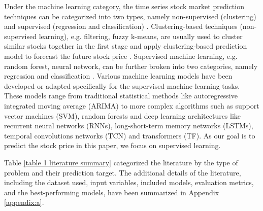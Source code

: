 \documentclass{article}
\begin{document}
Under the machine learning category, the time series stock market prediction techniques can be categorized into two types, namely non-supervised (clustering) and supervised (regression and classification) \citep{gandhmal2019systematic, kumbure2022machine}. Clustering-based techniques (non-supervised learning), e.g. filtering, fuzzy k-means, are usually used to cluster similar stocks together in the first stage and apply clustering-based prediction model to forecast the future stock price \citep{vilela2019forecasting, zhong2017comprehensive}. Supervised machine learning, e.g. random forest, neural network, can be further broken into two categories, namely regression and classification \citep{kumbure2022machine}. Various machine learning models have been developed or adapted specifically for the supervised machine learning tasks. These models range from traditional statistical methods like autoregressive integrated moving average (ARIMA) to more complex algorithms such as support vector machines (SVM), random forests and deep learning architectures like recurrent neural networks (RNNs), long-short-term memory networks (LSTMs), temporal convolutions networks (TCN) and transformers (TF).  As our goal is to predict the stock price in this paper, we focus on supervised learning. 

Table \ref{table 1 literature summary} categorized the literature by the type of problem and their prediction target. The additional details of the literature, including the dataset used, input variables, included models, evaluation metrics, and the best-performing models, have been summarized in Appendix \ref{appendix:a}.
\end{document}
